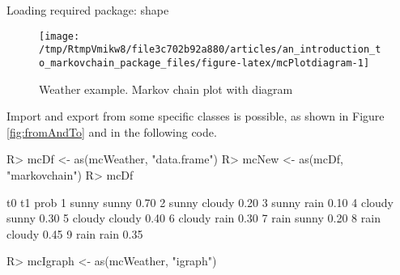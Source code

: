 \documentclass[
  nojss]{jss}
\begin{document}
\begin{CodeChunk}

\begin{CodeOutput}
Loading required package: shape
\end{CodeOutput}
\begin{figure}

{\centering \texttt{[image: /tmp/RtmpVmikw8/file3c702b92a880/articles/an\_introduction\_to\_markovchain\_package\_files/figure-latex/mcPlotdiagram-1]} 

}

\caption[Weather example]{Weather example. Markov chain plot with diagram}\label{fig:mcPlotdiagram}
\end{figure}
\end{CodeChunk}

Import and export from some specific classes is possible, as shown in Figure \ref{fig:fromAndTo} and in the following code.

\begin{CodeChunk}

\begin{CodeInput}
R> mcDf <- as(mcWeather, "data.frame")
R> mcNew <- as(mcDf, "markovchain")
R> mcDf
\end{CodeInput}

\begin{CodeOutput}
      t0     t1 prob
1  sunny  sunny 0.70
2  sunny cloudy 0.20
3  sunny   rain 0.10
4 cloudy  sunny 0.30
5 cloudy cloudy 0.40
6 cloudy   rain 0.30
7   rain  sunny 0.20
8   rain cloudy 0.45
9   rain   rain 0.35
\end{CodeOutput}

\begin{CodeInput}
R> mcIgraph <- as(mcWeather, "igraph")
\end{CodeInput}
\end{CodeChunk}
\end{document}
